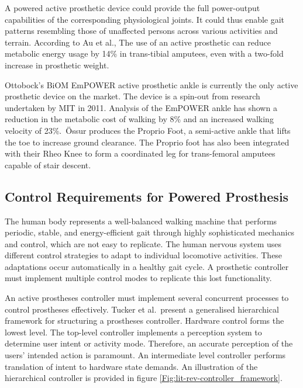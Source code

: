 A powered active prosthetic device could provide the full power-output capabilities of the corresponding physiological joints. It could thus enable gait patterns resembling those of unaffected persons across various activities and terrain\cite{Tucker2015, Bhakta2020}. According to Au et al., The use of an active prosthetic can reduce metabolic energy usage by 14\% in trans-tibial amputees, even with a two-fold increase in prosthetic weight\cite{Au2009}.

Ottobock's BiOM EmPOWER active prosthetic ankle is currently the only active prosthetic device on the market.\cite{Nayak2020} The device is a spin-out from research undertaken by MIT in 2011.\cite{biom2018} Analysis of the EmPOWER ankle has shown a reduction in the metabolic cost of walking by 8\% and an increased walking velocity of 23\%\cite{Herr2012}.\ {\"O}ssur produces the Proprio Foot, a semi-active ankle that lifts the toe to increase ground clearance. The Proprio foot has also been integrated with their Rheo Knee to form a coordinated leg for trans-femoral amputees capable of stair descent.\cite{Ossur}

\subsection{Control Requirements for Powered Prosthesis} %
The human body represents a well-balanced walking machine that performs periodic, stable, and energy-efficient gait through highly sophisticated mechanics and control, which are not easy to replicate\cite{Mummolo2013}. The human nervous system uses different control strategies to adapt to individual locomotive activities\cite{Lay2007, Simon2013}. These adaptations occur automatically in a healthy gait cycle. A prosthetic controller must implement multiple control modes to replicate this lost functionality.

An active prostheses controller must implement several concurrent processes to control prostheses effectively. Tucker et al.~present a generalised hierarchical framework for structuring a prostheses controller. Hardware control forms the lowest level. The top-level controller implements a perception system to determine user intent or activity mode. Therefore, an accurate perception of the users' intended action is paramount\cite{Asif2021, Hernandez2021}. An intermediate level controller performs translation of intent to hardware state demands. An illustration of the hierarchical controller is provided in figure \ref{Fig:lit-rev-controller_framework}.\cite{Tucker2015}

